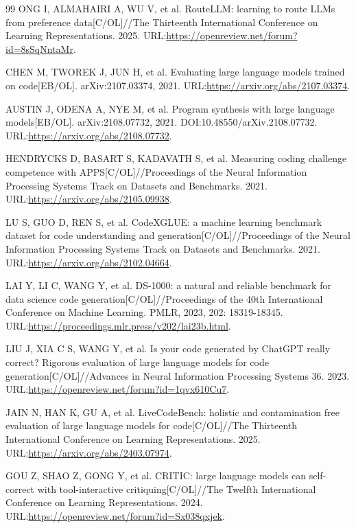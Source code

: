 \begin{thebibliography}{99}
ONG I, ALMAHAIRI A, WU V, et al.
RouteLLM: learning to route LLMs from preference data[C/OL]//The Thirteenth International Conference on Learning Representations.
2025.
URL:\url{https://openreview.net/forum?id=8sSqNntaMr}.

CHEN M, TWOREK J, JUN H, et al.
Evaluating large language models trained on code[EB/OL].
arXiv:2107.03374, 2021.
URL:\url{https://arxiv.org/abs/2107.03374}.

AUSTIN J, ODENA A, NYE M, et al.
Program synthesis with large language models[EB/OL].
arXiv:2108.07732, 2021.
DOI:10.48550/arXiv.2108.07732.
URL:\url{https://arxiv.org/abs/2108.07732}.

HENDRYCKS D, BASART S, KADAVATH S, et al.
Measuring coding challenge competence with APPS[C/OL]//Proceedings of the Neural Information Processing Systems Track on Datasets and Benchmarks.
2021.
URL:\url{https://arxiv.org/abs/2105.09938}.

LU S, GUO D, REN S, et al.
CodeXGLUE: a machine learning benchmark dataset for code understanding and generation[C/OL]//Proceedings of the Neural Information Processing Systems Track on Datasets and Benchmarks.
2021.
URL:\url{https://arxiv.org/abs/2102.04664}.

LAI Y, LI C, WANG Y, et al.
DS-1000: a natural and reliable benchmark for data science code generation[C/OL]//Proceedings of the 40th International Conference on Machine Learning.
PMLR, 2023, 202: 18319-18345.
URL:\url{https://proceedings.mlr.press/v202/lai23b.html}.

LIU J, XIA C S, WANG Y, et al.
Is your code generated by ChatGPT really correct? Rigorous evaluation of large language models for code generation[C/OL]//Advances in Neural Information Processing Systems 36.
2023.
URL:\url{https://openreview.net/forum?id=1qvx610Cu7}.

JAIN N, HAN K, GU A, et al.
LiveCodeBench: holistic and contamination free evaluation of large language models for code[C/OL]//The Thirteenth International Conference on Learning Representations.
2025.
URL:\url{https://arxiv.org/abs/2403.07974}.

GOU Z, SHAO Z, GONG Y, et al.
CRITIC: large language models can self-correct with tool-interactive critiquing[C/OL]//The Twelfth International Conference on Learning Representations.
2024.
URL:\url{https://openreview.net/forum?id=Sx038qxjek}.


\end{thebibliography}
